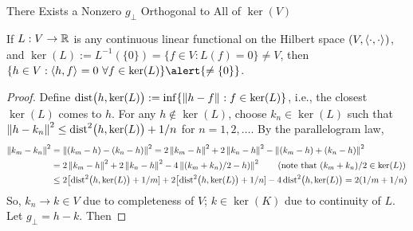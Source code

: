 \documentclass[10pt,compress,xcolor={usenames,dvipsnames},aspectratio=169]{beamer}
\begin{document}
\begin{frame}[label = lemma]{There Exists a Nonzero $g_\perp$ Orthogonal to All of $\ker(V)$ \hyperlink{generalRiesz}{}}
\begin{lemma}
     If $L: V \to \mathbb{R}$ is any \alert{continuous} linear functional on the Hilbert space $(V,\left \langle \cdot, \cdot \right \rangle_{{}})$, and $\ker(L) := L^{-1}(\{0\}) = \{f \in V : L(f) = 0\} \ne V$,
 	then $ \{ h \in V : \ip{h}{f} = 0 \ \forall f \in \ker(L)\} \alert{\ne \{0\}}$.
\end{lemma}
\begin{proof}
Define $\operatorname{dist}\bigl(h,\ker(L)\bigr) := \inf\{ \left \lVert h - f \right \rVert_{{}} : f \in \ker(L)\}$, i.e., the closest $\ker(L)$ comes to $h$.  For any $h \notin \ker(L)$, choose $k_n \in \ker(L)$ such that $\left \lVert h - k_n \right \rVert_{{}}^2 \le \operatorname{dist}^2\bigl(h,\ker(L)\bigr) + 1/n$ for $n = 1, 2, \ldots$.  By the \alert{parallelogram law}, 
\begin{align*}
	\left \lVert k_m - k_n \right \rVert_{{}}^2 &= \left \lVert (k_m - h) - (k_n-h)  \right \rVert_{{}}^2 = 2\left \lVert k_m - h \right \rVert_{{}}^2 + 2\left \lVert k_n-h \right \rVert_{{}}^2 - \left \lVert (k_m - h) + (k_n-h)  \right \rVert_{{}}^2 \\
	&= 2\left \lVert k_m - h \right \rVert_{{}}^2 + 2\left \lVert k_n-h \right \rVert_{{}}^2 - 4\left \lVert (k_m+k_n)/2-h)  \right \rVert_{{}}^2 \qquad \text{(note that $(k_m+k_n)/2 \in \ker(L)$)}\\
	& \le 2\bigl[\operatorname{dist}^2\bigl(h,\ker(L)\bigr) + 1/m] + 2\bigl[\operatorname{dist}^2\bigl(h,\ker(L)\bigr) + 1/n] - 4\operatorname{dist}^2\bigl(h,\ker(L)\bigr) = 2(1/m+1/n)
\end{align*}
So, $k_n \to k \in V$ due to completeness of $V$; $k \in \ker(K)$ due to continuity of $L$. Let $g_\perp = h - k$.  Then 
\end{proof}
\end{frame}
\end{document}
